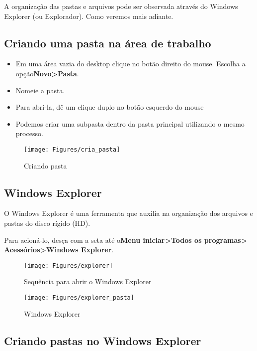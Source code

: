 \documentclass[hidelinks,12pt]{article}
\begin{document}
	A organização das pastas e arquivos pode ser observada através do Windows Explorer (ou Explorador). Como veremos mais adiante.
	
	\subsection{Criando uma pasta na área de trabalho}
	
	\begin{itemize}
		\item Em uma área vazia do desktop clique no botão direito do mouse. Escolha a opção{\bf Novo>Pasta}.
		\item Nomeie a pasta.
		\item Para abri-la, dê um clique duplo no botão esquerdo do mouse
		\item Podemos criar uma subpasta dentro da pasta principal utilizando o mesmo processo.
	\end{itemize}
	
		\begin{figure}[!h]
			\centering
			\texttt{[image: Figures/cria\_pasta]}
			\caption{Criando pasta}
			\label{fig:criando pasta}
		\end{figure}
		
	\subsection{Windows Explorer}
	
		O Windows Explorer é uma ferramenta que auxilia na organização dos arquivos e pastas do disco rígido (HD).	
		
		Para acioná-lo, desça com a seta até o{\bf Menu iniciar>Todos os programas> Acessórios>Windows Explorer}.
	
		\begin{figure}[!h]
			\centering
			\texttt{[image: Figures/explorer]}
			\caption{Sequência para abrir o Windows Explorer}
			\label{fig:explorer}
		\end{figure}
		
			
			\begin{figure}[!h]
				\centering
				\texttt{[image: Figures/explorer\_pasta]}
				\caption{Windows Explorer}
				\label{fig:explorer_p}
			\end{figure}
			
		\newpage	
		\subsection{Criando pastas no Windows Explorer}
		
\end{document}
